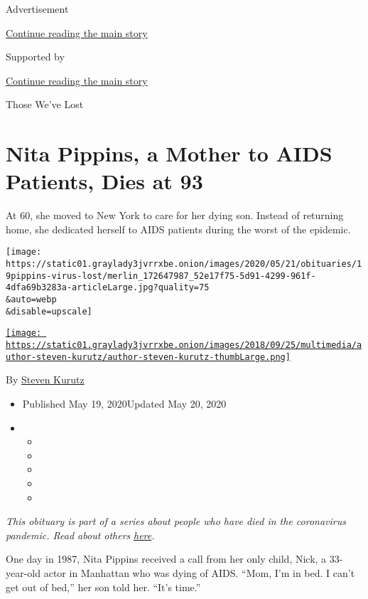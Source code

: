 Advertisement

\protect\hyperlink{after-top}{Continue reading the main story}

Supported by

\protect\hyperlink{after-sponsor}{Continue reading the main story}

Those We've Lost

\hypertarget{nita-pippins-a-mother-to-aids-patients-dies-at-93}{%
\section{Nita Pippins, a Mother to AIDS Patients, Dies at
93}\label{nita-pippins-a-mother-to-aids-patients-dies-at-93}}

At 60, she moved to New York to care for her dying son. Instead of
returning home, she dedicated herself to AIDS patients during the worst
of the epidemic.

\texttt{[image: https://static01.graylady3jvrrxbe.onion/images/2020/05/21/obituaries/19pippins-virus-lost/merlin\_172647987\_52e17f75-5d91-4299-961f-4dfa69b3283a-articleLarge.jpg?quality=75\\\&auto=webp\\\&disable=upscale]}

\href{https://www.nytimes3xbfgragh.onion/by/steven-kurutz}{\texttt{[image: https://static01.graylady3jvrrxbe.onion/images/2018/09/25/multimedia/author-steven-kurutz/author-steven-kurutz-thumbLarge.png]}}

By \href{https://www.nytimes3xbfgragh.onion/by/steven-kurutz}{Steven
Kurutz}

\begin{itemize}
\item
  Published May 19, 2020Updated May 20, 2020
\item
  \begin{itemize}
  \item
  \item
  \item
  \item
  \item
  \end{itemize}
\end{itemize}

\emph{This obituary is part of a series about people who have died in
the coronavirus pandemic. Read about others}
\href{https://www.nytimes3xbfgragh.onion/series/people-who-have-died-of-the-coronavirus}{\emph{here}}\emph{.}

One day in 1987, Nita Pippins received a call from her only child, Nick,
a 33-year-old actor in Manhattan who was dying of AIDS. ``Mom, I'm in
bed. I can't get out of bed,'' her son told her. ``It's time.''


